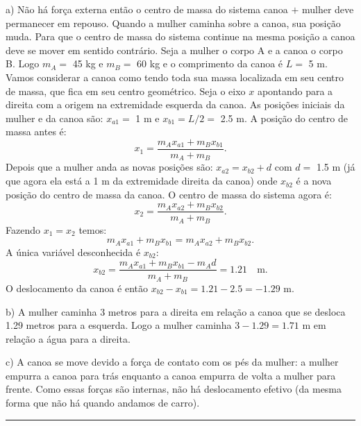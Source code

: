 \documentclass[12pt]{article}
\newenvironment{problem}[2][{\color{red}Problema}]{\begin{trivlist}
\item[\hskip \labelsep {\bfseries #1}\hskip \labelsep {\bfseries #2.}]}{\end{trivlist}}
\begin{document}
\begin{problem}{1}
a) Não há força externa então o centro de massa do sistema canoa $+$ mulher deve permanecer em repouso. Quando a mulher caminha sobre a canoa, sua posição muda. Para que o centro de massa do sistema continue na mesma posição a canoa deve se mover em sentido contrário. Seja a mulher o corpo A e a canoa o corpo B. Logo $m_A =$ 45 kg e $m_B=$ 60 kg e o comprimento da canoa é $L=$ 5 m. Vamos considerar a canoa como tendo toda sua massa localizada em seu centro de massa, que fica em seu centro geométrico. Seja o eixo $x$ apontando para a direita com a origem na extremidade esquerda da canoa. As posições iniciais da mulher e da canoa são: $x_{a1}=$ 1 m e $x_{b1}=L/2=$ 2.5 m. A posição do centro de massa antes é:
\begin{equation}
x_1 = \dfrac{m_A x_{a1} + m_B x_{b1}}{m_A + m_B}. \nonumber
\end{equation}
Depois que a mulher anda as novas posições são: $x_{a2} =x_{b2}+d$ com $d=$ 1.5 m (já que agora ela está a 1 m da extremidade direita da canoa) onde $x_{b2}$ é a nova posição do centro de massa da canoa. O centro de massa do sistema agora é:
\begin{equation}
x_2 = \dfrac{m_A x_{a2} + m_B x_{b2}}{m_A + m_B}. \nonumber
\end{equation}
Fazendo $x_1 = x_2$ temos:
\begin{equation}
m_A x_{a1} + m_B x_{b1} = m_A x_{a2} + m_B x_{b2}. \nonumber
\end{equation}
A única variável desconhecida é $x_{b2}$:
\begin{equation}
x_{b2} = \dfrac{m_A x_{a1} + m_B x_{b1} - m_A d}{m_A + m_B} = 1.21 \quad \text{m}. \nonumber
\end{equation}
O deslocamento da canoa é então {\color{red}$x_{b2} - x_{b1}= 1.21 - 2.5 = - 1.29$ m}.

\noindent
b) A mulher caminha 3 metros para a direita em relação a canoa que se desloca 1.29 metros para a esquerda. Logo a mulher caminha {\color{red}$3 - 1.29 = 1.71$ m} em relação a água para a direita.

\noindent
c) A canoa se move devido a força de contato com os pés da mulher: a mulher empurra a canoa para trás enquanto a canoa empurra de volta a mulher para frente. Como essas forças são internas, não há deslocamento efetivo (da mesma forma que não há quando andamos de carro).
\end{problem}

\begin{center}
\noindent\rule{13cm}{0.5pt}
\end{center}
\end{document}
